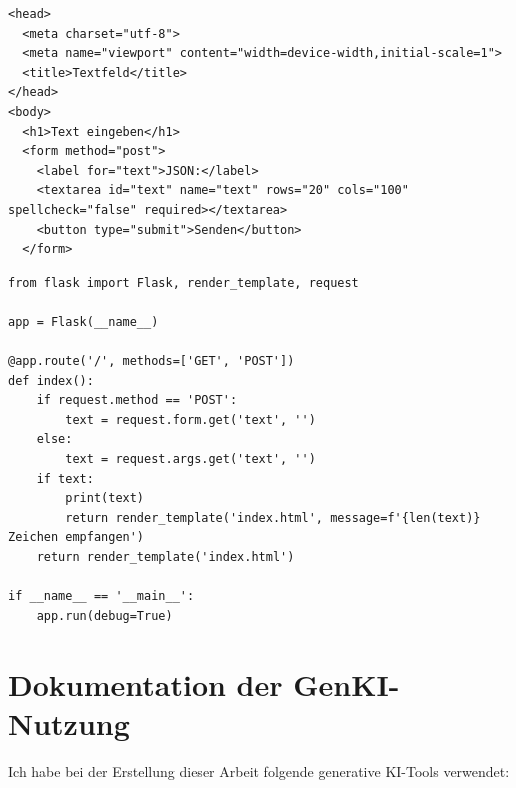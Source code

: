 \documentclass[
thesis=master,
%
language=german,
%
faculty=cb,	
%
%
%
%
%
%
%
%
graduatedtoc,
%
fancy,
%
glossaryfront,
%
%
%
%
%
%
%
%
%
%
%
%
%
%
%
%
%
]{hsmw-vorlage-rw}
\begin{document}
\begin{lstlisting}[caption={index.html (Auszug)}]
<head>
  <meta charset="utf-8">
  <meta name="viewport" content="width=device-width,initial-scale=1">
  <title>Textfeld</title>
</head>
<body>
  <h1>Text eingeben</h1>
  <form method="post">
    <label for="text">JSON:</label>
    <textarea id="text" name="text" rows="20" cols="100" spellcheck="false" required></textarea>
    <button type="submit">Senden</button>
  </form>
\end{lstlisting}

\begin{lstlisting}[caption={main.py}]
from flask import Flask, render_template, request

app = Flask(__name__)

@app.route('/', methods=['GET', 'POST'])
def index():
    if request.method == 'POST':
        text = request.form.get('text', '')
    else:
        text = request.args.get('text', '')
    if text:
        print(text)
        return render_template('index.html', message=f'{len(text)} Zeichen empfangen')
    return render_template('index.html')

if __name__ == '__main__':
    app.run(debug=True)
\end{lstlisting}


% 
% 



\chapter{Dokumentation der GenKI-Nutzung}\label{ch:anhang_genki}

Ich habe bei der Erstellung dieser Arbeit folgende generative KI-Tools verwendet:
\end{document}
